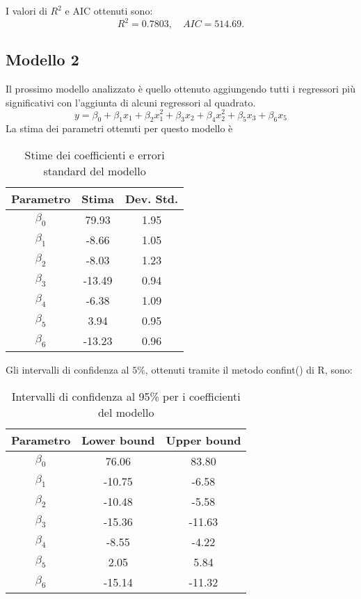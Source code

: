 I valori di $R^2$ e AIC ottenuti sono:
\begin{equation*}
	R^2 = 0.7803, \quad AIC = 514.69.
\end{equation*}
\subsection{Modello 2}
Il prossimo modello analizzato è quello ottenuto aggiungendo tutti i regressori più significativi con l'aggiunta di alcuni regressori al quadrato.
\begin{equation*}
	y=\beta_0 + \beta_1x_1+\beta_2x_1^2+\beta_3x_2+\beta_4x_2^2+\beta_5x_3+\beta_6x_5
\end{equation*}
La stima dei parametri ottenuti per questo modello è
\begin{table}[H]
	\centering
	\begin{tabular}{|c|c|c|}
		\hline
		\textbf{Parametro} & \textbf{Stima} & \textbf{Dev. Std.} \\
		\hline
		$\beta_0$ & 79.93  & 1.95 \\
		$\beta_1$ & -8.66  & 1.05 \\
		$\beta_2$ & -8.03  & 1.23 \\
		$\beta_3$ & -13.49 & 0.94 \\
		$\beta_4$ & -6.38  & 1.09 \\
		$\beta_5$ & 3.94   & 0.95 \\
		$\beta_6$ & -13.23 & 0.96 \\
		\hline
	\end{tabular}
	\caption{Stime dei coefficienti e errori standard del modello}
	\label{tab:coef_estimates_poly}
\end{table}

Gli intervalli di confidenza al $5\%$, ottenuti tramite il metodo confint() di R, sono:
\begin{table}[H]
	\centering
	\begin{tabular}{|c|c|c|}
		\hline
		\textbf{Parametro} & \textbf{Lower bound} & \textbf{Upper bound} \\
		\hline
		$\beta_0$ & 76.06 & 83.80 \\
		$\beta_1$ & -10.75 & -6.58 \\
		$\beta_2$ & -10.48 & -5.58 \\
		$\beta_3$ & -15.36 & -11.63 \\
		$\beta_4$ & -8.55 & -4.22 \\
		$\beta_5$ & 2.05 & 5.84 \\
		$\beta_6$ & -15.14 & -11.32 \\
		\hline
	\end{tabular}
	\caption{Intervalli di confidenza al 95\% per i coefficienti del modello}
	\label{tab:ci_coefficienti}
\end{table}


